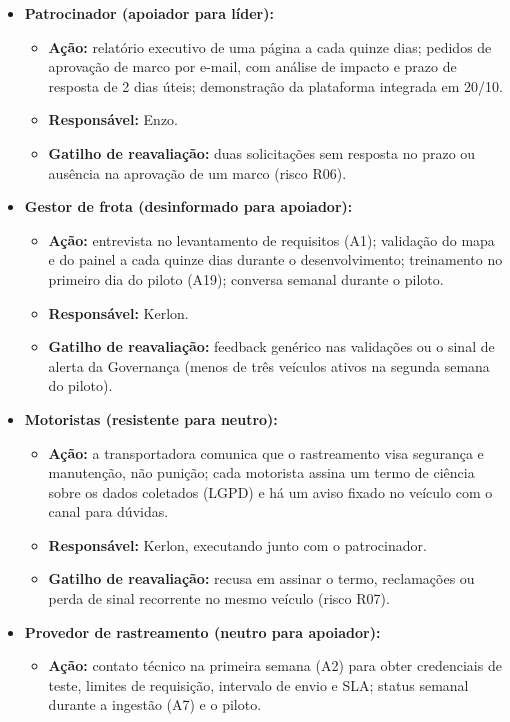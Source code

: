 \documentclass[11pt,a4paper]{article}
\begin{document}
\begin{itemize}[itemsep=5pt]
  \item \textbf{Patrocinador (apoiador para líder):}
  \begin{itemize}[label=--]
    \item \textbf{Ação:} relatório executivo de uma página a cada quinze dias; pedidos de aprovação de marco por e-mail, com análise de impacto e prazo de resposta de 2 dias úteis; demonstração da plataforma integrada em 20/10.
    \item \textbf{Responsável:} Enzo.
    \item \textbf{Gatilho de reavaliação:} duas solicitações sem resposta no prazo ou ausência na aprovação de um marco (risco R06).
  \end{itemize}
  \item \textbf{Gestor de frota (desinformado para apoiador):}
  \begin{itemize}[label=--]
    \item \textbf{Ação:} entrevista no levantamento de requisitos (A1); validação do mapa e do painel a cada quinze dias durante o desenvolvimento; treinamento no primeiro dia do piloto (A19); conversa semanal durante o piloto.
    \item \textbf{Responsável:} Kerlon.
    \item \textbf{Gatilho de reavaliação:} feedback genérico nas validações ou o sinal de alerta da Governança (menos de três veículos ativos na segunda semana do piloto).
  \end{itemize}
  \item \textbf{Motoristas (resistente para neutro):}
  \begin{itemize}[label=--]
    \item \textbf{Ação:} a transportadora comunica que o rastreamento visa segurança e manutenção, não punição; cada motorista assina um termo de ciência sobre os dados coletados (LGPD) e há um aviso fixado no veículo com o canal para dúvidas.
    \item \textbf{Responsável:} Kerlon, executando junto com o patrocinador.
    \item \textbf{Gatilho de reavaliação:} recusa em assinar o termo, reclamações ou perda de sinal recorrente no mesmo veículo (risco R07).
  \end{itemize}
  \item \textbf{Provedor de rastreamento (neutro para apoiador):}
  \begin{itemize}[label=--]
    \item \textbf{Ação:} contato técnico na primeira semana (A2) para obter credenciais de teste, limites de requisição, intervalo de envio e SLA; status semanal durante a ingestão (A7) e o piloto.

\end{itemize}
\end{itemize}
\end{document}
